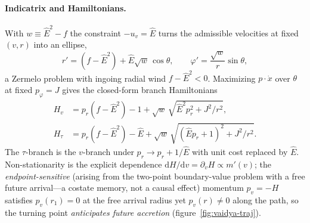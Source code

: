 \documentclass[12pt]{iopart}
\newcommand{\Ehat}{\hat E}
\newcommand{\dd}{\mathrm{d}}
\begin{document}
\paragraph{Indicatrix and Hamiltonians.} With $w\equiv\Ehat^2-f$ the constraint
$-u_v=\Ehat$ turns the admissible velocities at fixed $(v,r)$ into an ellipse,
\begin{equation}
    r'=(f-\Ehat^2)+\Ehat\sqrt w\,\cos\theta,\qquad
    \varphi'=\frac{\sqrt w}{r}\sin\theta,
    \label{eq:vaidya-ind}
\end{equation}
a Zermelo problem with ingoing radial wind $f-\Ehat^2<0$. Maximizing
$p\cdot\dot x$ over $\theta$ at fixed $p_\varphi=J$ gives the closed-form branch
Hamiltonians
\begin{align}
    H_v&=p_r(f-\Ehat^2)-1+\sqrt w\,\sqrt{\Ehat^2 p_r^2+J^2/r^2},
    \label{eq:Hv}\\
    H_\tau&=p_r(f-\Ehat^2)-\Ehat
        +\sqrt w\,\sqrt{(\Ehat p_r+1)^2+J^2/r^2}.
    \label{eq:Htau-vaidya}
\end{align}
The $\tau$-branch is the $v$-branch under $p_r\to p_r+1/\Ehat$ with unit cost
replaced by $\Ehat$. Non-stationarity is the explicit dependence
$\dd H/\dd v=\partial_v H\propto m'(v)$; the \emph{endpoint-sensitive} (arising from the
two-point boundary-value problem with a free future arrival---a costate memory, not a
causal effect) momentum $p_v=-H$
satisfies $p_v(r_1)=0$ at the free arrival radius yet $p_v(r)\neq0$ along the
path, so the turning point \emph{anticipates future accretion}
(figure~\ref{fig:vaidya-traj}).
\end{document}
